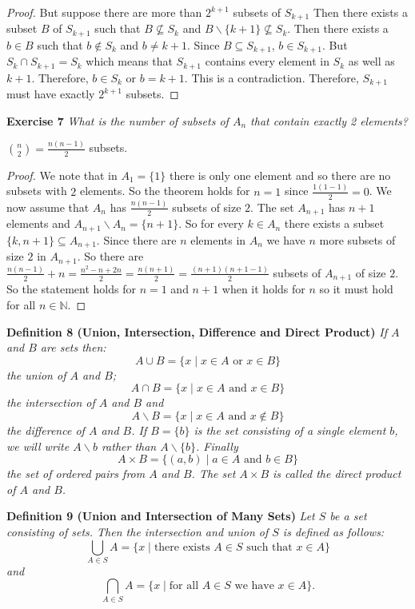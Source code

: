 \documentclass{article}
\begin{document}
\begin{flushleft}
\begin{proof}
But suppose there are more than $2^{k+1}$ subsets of $S_{k+1}$ Then there exists a subset $B$ of $S_{k+1}$ such that $B \nsubseteq S_k$ and $B \backslash \{k+1\} \nsubseteq S_k$. Then there exists a $b \in B$ such that $b \notin S_k$ and $b \neq k+1$. Since $B \subseteq S_{k+1}$, $b \in S_{k+1}$. But $S_k \cap S_{k+1} = S_k$ which means that $S_{k+1}$ contains every element in $S_k$ as well as $k+1$. Therefore, $b \in S_k$ or $b = k+1$. This is a contradiction. Therefore, $S_{k+1}$ must have exactly $2^{k+1}$ subsets.
\end{proof}

\textbf{Exercise 7}
\textsl{What is the number of subsets of $A_n$ that contain exactly 2 elements?}\newline

$\binom{n}{2} = \frac{n(n-1)}{2}$ subsets.\newline

\begin{proof}
We note that in $A_1 = \{1\}$ there is only one element and so there are no subsets with $2$ elements. So the theorem holds for $n=1$ since $\frac{1(1-1)}{2}=0$. We now assume that $A_{n}$ has $\frac{n(n-1)}{2}$ subsets of size $2$. The set $A_{n+1}$ has $n+1$ elements and $A_{n+1} \backslash A_n = \{n+1\}$. So for every $k \in A_n$ there exists a subset $\{k,n+1\} \subseteq A_{n+1}$. Since there are $n$ elements in $A_n$ we have $n$ more subsets of size $2$ in $A_{n+1}$. So there are $\frac{n(n-1)}{2} + n = \frac{n^2-n+2n}{2} = \frac{n(n+1)}{2} = \frac{(n+1)(n+1-1)}{2}$ subsets of $A_{n+1}$ of size $2$. So the statement holds for $n=1$ and $n+1$ when it holds for $n$ so it must hold for all $n \in \mathbb{N}$.
\end{proof}

\textbf{Definition 8 (Union, Intersection, Difference and Direct Product)}
\textsl{If $A$ and $B$ are sets then:
\[
A \cup B = \{x \mid x \in A \text{ or } x \in B\}
\]
the union of $A$ and $B$;
\[
A \cap B = \{x \mid x \in A \text{ and } x \in B\}
\]
the intersection of $A$ and $B$ and
\[
A \backslash B = \{x \mid x \in A \text{ and } x \notin B\}
\]
the difference of $A$ and $B$. If $B = \{b\}$ is the set consisting of a single element $b$, we will write $A \backslash b$ rather than $A \backslash \{b\}$. Finally
\[
A \times B = \{(a,b) \mid a \in A \text{ and } b \in B\}
\]
the set of ordered pairs from $A$ and $B$. The set $A \times B$ is called the direct product of $A$ and $B$.}\newline

\textbf{Definition 9 (Union and Intersection of Many Sets)}
\textsl{Let $S$ be a set consisting of sets. Then the intersection and union of $S$ is defined as follows:
\[
\bigcup_{A \in S} A = \{x \mid \text{there exists } A \in S \text{ such that } x \in A\}
\]
and
\[
\bigcap_{A \in S} A = \{x \mid \text{for all } A \in S \text{ we have } x \in A\}.
\]} 


\end{flushleft}
\end{document}

